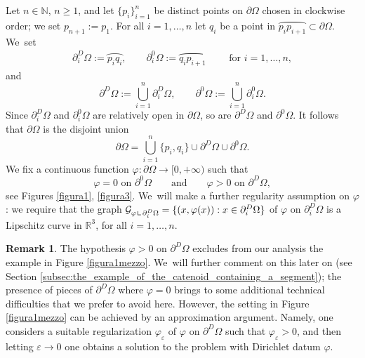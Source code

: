 \documentclass[JEP,XML,SOM,Unicode, NoFloatCountersInSection,published]{cedram}
\newcommand{\R}{\mathbb{R}}
\let\arc\wideparen
\let\eps\varepsilon
\let\Om\Omega
\newcommand{\dOm}{\partial \Om}
\newcommand{\nullb}{\partial^0}
\newcommand{\resa}{\mathop{\hbox{\vrule height 7pt width 0.5pt depth 0pt
\vrule height 0.5pt width 6pt depth 0pt}}\nolimits}
\newcommand{\resb}{\mathop{\hbox{\vrule height 4pt width 0.5pt depth 0pt
\vrule height 0.5pt width 3pt depth 0pt}}\nolimits}
\newcommand{\res}{\mathchoice{\resa}{\resa}{\resb}{\resb}}
\theoremstyle{definition}
\newtheorem{Remark}[theorem]{Remark}
\begin{document}
Let $n\in\mathbb N$, $n \geq 1$, and let $\{p_i\}_{i=1}^n$ be
distinct points on $\partial\Omega$ chosen in clockwise order;
we set $p_{n+1} := p_1$.
For all $i=1,\dots,n$ let $q_i$ be a point in
$\arc{p_ip_{i+1}}
\subset \dOm$. We~set
\begin{align}
\partial_i^D\Omega:=\arc{p_iq_i},\qquad\nullb_i\Omega:=\arc{q_ip_{i+1}}\qquad \text{ for }i=1,\dots,n,
\end{align}
and
\begin{equation}
\partial^D\Om:=\bigcup_{i=1}^n\partial_i^D\Om,\qquad \nullb\Om:=\bigcup_{i=1}^n\nullb_i\Om.
\end{equation}
Since $\partial_i^D\Om$ and $\nullb_i\Omega$
are relatively open in $\partial \Omega$,
so are $\partial^D\Omega$ and $\nullb\Omega$. It follows that $\partial
\Om$ is the disjoint union
\[
\partial\Omega=\bigcup_{i=1}^n\{p_i,q_i\}\cup \partial^D\Om \cup
\nullb\Om.
\]
We fix a continuous function
$\varphi:\partial \Omega\to [0,+\infty)$ such that
\begin{equation}\label{boundary-value}
\varphi = 0 \text{ on } \nullb\Omega
\qquad \text{and} \qquad
\varphi >0 \text{ on }\partial^D\Omega,
\end{equation}
see Figures \ref{figura1}, \ref{figura3}. We~will make a further regularity assumption on $\varphi$: we require that the graph $\mathcal G_{\varphi\res\partial^D_i\Om}=\{(x,\varphi(x)):x\in \partial^D_i\Om\}$ of $\varphi$ on $\partial^D_i\Om$ is a Lipschitz curve in $\R^3$, for all $i=1,\dots,n$.
\begin{Remark}\rm
The hypothesis $\varphi>0$ on $\partial^D\Om$ excludes from our analysis
the example in Figure \ref{figura1mezzo}. We~will further comment on this later on (see Section \ref{subsec:the_example_of_the_catenoid_containing_a_segment}); the presence of pieces of $\partial^D\Om$ where $\varphi=0$ brings to some additional technical difficulties that we prefer to avoid here. However, the setting in Figure \ref{figura1mezzo} can be
achieved by an approximation argument. Namely, one considers a suitable regularization $\varphi_\eps$ of $\varphi$ on $\partial^D\Om$ such that $\varphi_\eps>0$, and then letting $\eps\to0$ one obtains a solution to the problem with Dirichlet datum $\varphi$.
\end{Remark}
\end{document}

